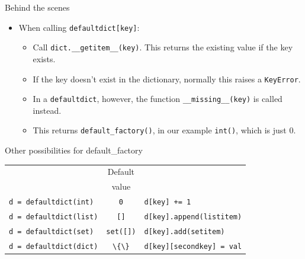 \documentclass{beamer}
\begin{document}
\begin{frame}{Behind the scenes}
\begin{itemize}

  \item When calling \lstinline$defaultdict[key]$:
    \begin{itemize}
      \item Call \lstinline$dict.__getitem__(key)$. This returns the existing value if the key exists.
      \item If the key doesn't exist in the dictionary, normally this raises a \lstinline$KeyError$.
      \item In a \lstinline$defaultdict$, however, the function \lstinline$__missing__(key)$ is called instead.
      \item This returns \lstinline$default_factory()$, in our example \lstinline$int()$, which is just 0.
    \end{itemize}
  
\end{itemize}

\end{frame}

\begin{frame}{Other possibilities for default\_factory}
 \begin{tabular}{lcl}
      & Default & \\
      & value   & \\
   \lstinline$d = defaultdict(int)$  & \lstinline$0$ & \lstinline$d[key] += 1$ \\
   \lstinline$d = defaultdict(list)$ & \lstinline$[]$ & \lstinline$d[key].append(listitem)$ \\
   \lstinline$d = defaultdict(set)$  & \lstinline$set([])$ & \lstinline$d[key].add(setitem)$ \\
   \lstinline$d = defaultdict(dict)$ & \lstinline$\{\}$ & \lstinline$d[key][secondkey] = val$ \\
 \end{tabular}
\end{frame}
\end{document}

